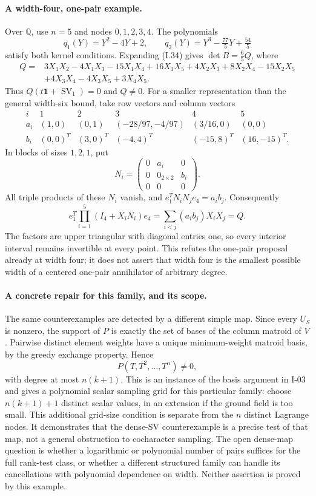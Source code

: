 \paragraph{A width-four, one-pair example.}
Over $\mathbb Q$, use $n=5$ and nodes $0,1,2,3,4$.
The polynomials
\[
 q_1(Y)=Y^2-4Y+2,\qquad
 q_2(Y)=Y^3-\tfrac{77}{5}Y+\tfrac{54}{5}
\]
satisfy both kernel conditions.  Expanding (I.34) gives
$\det B=\frac65 Q$, where
\[
\begin{split}
 Q={}&3X_1X_2-4X_1X_3-15X_1X_4+16X_1X_5
       +4X_2X_3+8X_2X_4-15X_2X_5\\
    &+4X_3X_4-4X_3X_5+3X_4X_5.
\end{split}
\tag{I.35}
\]
Thus $Q(t\mathbf1+\operatorname{SV}_1)=0$ and $Q\ne0$.
For a smaller representation than the general width-six bound,
take row vectors and column vectors
\[
\begin{array}{c|ccccc}
i&1&2&3&4&5\\ \hline
a_i&(1,0)&(0,1)&(-28/97,-4/97)&(3/16,0)&(0,0)\\
b_i&(0,0)^T&(3,0)^T&(-4,4)^T&(-15,8)^T&(16,-15)^T.
\end{array}
\]
In blocks of sizes $1,2,1$, put
\[
 N_i=\begin{pmatrix}0&a_i&0\\0&0_{2\times2}&b_i\\0&0&0\end{pmatrix}.
\]
All triple products of these $N_i$ vanish, and
$e_1^TN_iN_je_4=a_i b_j$.
Consequently
\[
 e_1^T\prod_{i=1}^5(I_4+X_iN_i)e_4
      =\sum_{i<j}(a_ib_j)X_iX_j=Q.
\]
The factors are upper triangular with diagonal entries one,
so every interior interval remains invertible at every point.
This refutes the one-pair proposal already at width four;
it does not assert that width four is the smallest possible
width of a centered one-pair annihilator of arbitrary degree.

\paragraph{A concrete repair for this family, and its scope.}
The same counterexamples are detected by a different simple
map.  Since every $U_S$ is nonzero, the support of $P$ is
exactly the set of bases of the column matroid of $V$.
Pairwise distinct element weights have a unique minimum-weight
matroid basis, by the greedy exchange property.  Hence
\[
 P(T,T^2,\ldots,T^n)\ne0,
\]
with degree at most $n(k+1)$.
This is an instance of the basis argument in I-03 and gives a
polynomial scalar sampling grid for this particular family:
choose $n(k+1)+1$ distinct scalar values, in an extension if
the ground field is too small.  This additional grid-size
condition is separate from the $n$ distinct Lagrange nodes.
It demonstrates that the dense-SV counterexample is a precise
test of that map, not a general obstruction to cocharacter
sampling.  The open dense-map question is whether a
logarithmic or polynomial number of pairs suffices for the
full rank-test class, or whether a different structured family
can handle its cancellations with polynomial dependence on
width.  Neither assertion is proved by this example.
